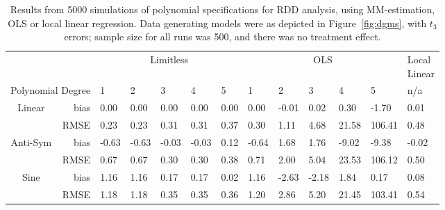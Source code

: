 
        \begin{table}[ht]
\centering
\begin{tabular}{cr|lllll|lllll|l }
  \hline
&& \multicolumn{5}{c|}{Limitless} &  \multicolumn{5}{c|}{OLS} &\makecell[c]{Local\\Linear}  \\
 \multicolumn{2}{r|}{Polynomial Degree}&1&2&3&4&5&1&2&3&4&5& n/a  \\
\hline
\hline
\multirow{ 2 }{*}{ Linear }& bias &0.00&0.00&0.00&0.00&0.00&0.00&-0.01&0.02&0.30&-1.70&0.01\\
& RMSE &0.23&0.23&0.31&0.31&0.37&0.30&1.11&4.68&21.58&106.41&0.48\\
\hline
\hline
\multirow{ 2 }{*}{ Anti-Sym }& bias &-0.63&-0.63&-0.03&-0.03&0.12&-0.64&1.68&1.76&-9.02&-9.38&-0.02\\
& RMSE &0.67&0.67&0.30&0.30&0.38&0.71&2.00&5.04&23.53&106.12&0.50\\
\hline
\hline
\multirow{ 2 }{*}{ Sine }& bias &1.16&1.16&0.17&0.17&0.02&1.16&-2.63&-2.18&1.84&0.17&0.08\\
& RMSE &1.18&1.18&0.35&0.35&0.36&1.20&2.86&5.20&21.45&103.41&0.54\\

 \hline
\end{tabular}
\caption{Results from 5000 simulations of polynomial specifications for RDD analysis, using MM-estimation, OLS or local linear regression. Data generating models were as depicted in Figure~\ref{fig:dgms}, with $t_{3}$ errors; sample size for all runs was 500, and there was no treatment effect.}
\label{tab:poly}
\end{table}
